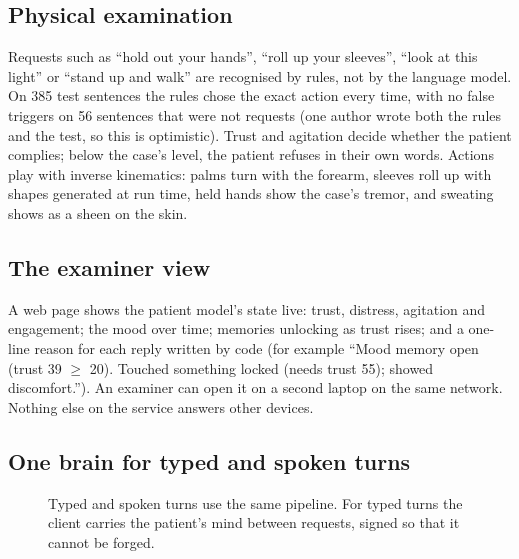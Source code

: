\documentclass[journal]{IEEEtran}
\begin{document}
\subsection{Physical examination}
Requests such as ``hold out your hands'', ``roll up your sleeves'', ``look at this light'' or ``stand up and walk'' are recognised by rules, not by
the language model. On 385 test sentences the rules chose the exact action every time, with no false triggers on 56 sentences that were not
requests (one author wrote both the rules and the test, so this is optimistic). Trust and agitation decide whether the patient complies; below
the case's level, the patient refuses in their own words. Actions play with inverse kinematics: palms turn with the forearm, sleeves roll up with
shapes generated at run time, held hands show the case's tremor, and sweating shows as a sheen on the skin.

\subsection{The examiner view}
A web page shows the patient model's state live: trust, distress, agitation and engagement; the mood over time; memories unlocking as trust
rises; and a one-line reason for each reply written by code (for example ``Mood memory open (trust 39 $\ge$ 20). Touched something locked (needs
trust 55); showed discomfort.''). An examiner can open it on a second laptop on the same network. Nothing else on the service answers other
devices.

\subsection{One brain for typed and spoken turns}\label{sec:paths}

\begin{figure}[t]
\centering
{}
\caption{Typed and spoken turns use the same pipeline. For typed turns the client carries the patient's mind between requests, signed so that
it cannot be forged.}
\label{fig:paths}
\end{figure}
\end{document}
